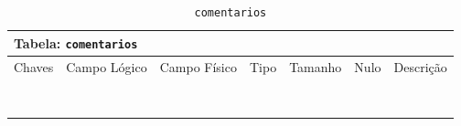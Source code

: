 \documentclass[12pt,a4paper]{article}
\begin{document}
\begin{center}
\begin{table}[h!]
	\caption{\texttt{comentarios}}
	\label{tabela:comentarios}
	\begin{tabular}{|p{1cm}|p{1.5cm}|p{1.25cm}|p{1.25cm}|p{1.75cm}|p{1.25cm}|p{4.5cm}|}\hline	
		\multicolumn{7}{|p{16cm}|}{\cellcolor{cinzaClaro}  \centering Tabela: \texttt{comentarios}} \\ \hline %
		{\small Chaves} & {\small Campo Lógico} & {\small Campo Físico} & {\small Tipo} & {\small Tamanho} & {\small Nulo} & {\small Descrição}\\\hline %
		
		{\tiny } & {\tiny } & {\tiny } & {\tiny } & {\tiny } & {\tiny } &{\tiny }\\\hline
		{\tiny } & {\tiny } & {\tiny } & {\tiny } & {\tiny } & {\tiny } &{\tiny }\\\hline
		{\tiny } & {\tiny } & {\tiny } & {\tiny } & {\tiny } & {\tiny } &{\tiny }\\\hline
		{\tiny } & {\tiny } & {\tiny } & {\tiny } & {\tiny } & {\tiny } &{\tiny }\\\hline
		{\tiny } & {\tiny } & {\tiny } & {\tiny } & {\tiny } & {\tiny } &{\tiny }\\\hline
		{\tiny } & {\tiny } & {\tiny } & {\tiny } & {\tiny } & {\tiny } &{\tiny }\\\hline
		{\tiny } & {\tiny } & {\tiny } & {\tiny } & {\tiny } & {\tiny } &{\tiny }\\\hline
		{\tiny } & {\tiny } & {\tiny } & {\tiny } & {\tiny } & {\tiny } &{\tiny }\\\hline
		
			
	\end{tabular}
\end{table}	
\end{center}
\end{document}
